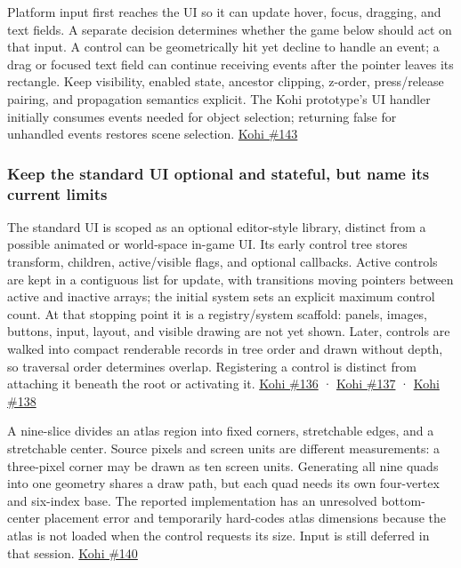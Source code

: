 Platform input first reaches the UI so it can update hover, focus, dragging, and text fields. A separate decision determines whether the game below should act on that input. A control can be geometrically hit yet decline to handle an event; a drag or focused text field can continue receiving events after the pointer leaves its rectangle. Keep visibility, enabled state, ancestor clipping, z-order, press/release pairing, and propagation semantics explicit. The Kohi prototype's UI handler initially consumes events needed for object selection; returning false for unhandled events restores scene selection. \href{https://www.youtube.com/watch?v=jLSfss8YrXE}{Kohi \#143}

\subsubsection{Keep the standard UI optional and stateful, but name its current limits}\label{keep-the-standard-ui-optional-and-stateful-but-name-its-current-limits}

The standard UI is scoped as an optional editor-style library, distinct from a possible animated or world-space in-game UI. Its early control tree stores transform, children, active/visible flags, and optional callbacks. Active controls are kept in a contiguous list for update, with transitions moving pointers between active and inactive arrays; the initial system sets an explicit maximum control count. At that stopping point it is a registry/system scaffold: panels, images, buttons, input, layout, and visible drawing are not yet shown. Later, controls are walked into compact renderable records in tree order and drawn without depth, so traversal order determines overlap. Registering a control is distinct from attaching it beneath the root or activating it. \href{https://www.youtube.com/watch?v=IGt08az4bLA}{Kohi \#136} · \href{https://www.youtube.com/watch?v=ptdE4nbVN0U}{Kohi \#137} · \href{https://www.youtube.com/watch?v=xqExSNvOc6A}{Kohi \#138}

A nine-slice divides an atlas region into fixed corners, stretchable edges, and a stretchable center. Source pixels and screen units are different measurements: a three-pixel corner may be drawn as ten screen units. Generating all nine quads into one geometry shares a draw path, but each quad needs its own four-vertex and six-index base. The reported implementation has an unresolved bottom-center placement error and temporarily hard-codes atlas dimensions because the atlas is not loaded when the control requests its size. Input is still deferred in that session. \href{https://www.youtube.com/watch?v=C_uF9W2niD0}{Kohi \#140}

